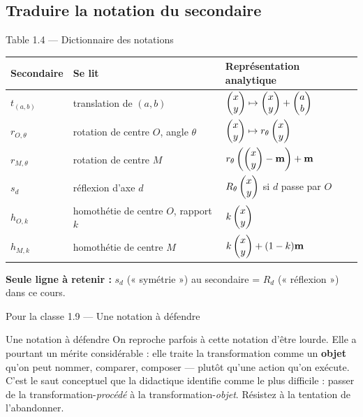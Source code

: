 \subsection{Traduire la notation du secondaire}
\begin{frame}{Table 1.4 --- Dictionnaire des notations}
  \small
  \begin{center}
  \begin{tabular}{lll}
    \toprule
    Secondaire & Se lit & Représentation analytique \\
    \midrule
    $t_{(a,b)}$ & translation de $(a,b)$
      & $\begin{pmatrix}x\\ y\end{pmatrix} \mapsto \begin{pmatrix}x\\ y\end{pmatrix} + \begin{pmatrix}a\\ b\end{pmatrix}$ \\[6pt]
    $r_{O,\theta}$ & rotation de centre $O$, angle $\theta$
      & $\begin{pmatrix}x\\ y\end{pmatrix} \mapsto r_\theta\begin{pmatrix}x\\ y\end{pmatrix}$ \\[6pt]
    $r_{M,\theta}$ & rotation de centre $M$
      & $r_\theta\left(\begin{pmatrix}x\\ y\end{pmatrix} - \mathbf{m}\right) + \mathbf{m}$ \\[6pt]
    $s_{d}$ & réflexion d'axe $d$
      & $R_\theta\begin{pmatrix}x\\ y\end{pmatrix}$ si $d$ passe par $O$ \\[6pt]
    $h_{O,k}$ & homothétie de centre $O$, rapport $k$
      & $k\begin{pmatrix}x\\ y\end{pmatrix}$ \\[6pt]
    $h_{M,k}$ & homothétie de centre $M$
      & $k\begin{pmatrix}x\\ y\end{pmatrix} + (1-k)\mathbf{m}$ \\
    \bottomrule
  \end{tabular}
  \end{center}
  \vspace{4pt}
  \small \textbf{Seule ligne à retenir :} $s_d$ (« symétrie ») au
  secondaire = $R_d$ (« réflexion ») dans ce cours.
\end{frame}

\begin{frame}{Pour la classe 1.9 --- Une notation à défendre}
  \begin{Classe}{Une notation à défendre}
    \small On reproche parfois à cette notation d'être lourde. Elle a
    pourtant un mérite considérable : elle traite la transformation
    comme un \textbf{objet} qu'on peut nommer, comparer, composer ---
    plutôt qu'une action qu'on exécute. C'est le saut conceptuel que la
    didactique identifie comme le plus difficile : passer de la
    transformation-\emph{procédé} à la transformation-\emph{objet}.
    Résistez à la tentation de l'abandonner.
  \end{Classe}
\end{frame}

